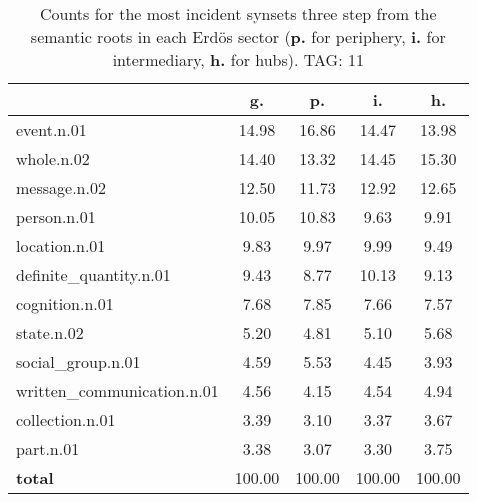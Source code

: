 \begin{table}[h!]
\begin{center}
\begin{tabular}{| l || c | c | c | c |}\hline
 & {\bf g.} & {\bf p.} & {\bf i.} & {\bf h.} \\\hline\hline
event.n.01 & 14.98  & 16.86  & 14.47  & 13.98 \\\hline
whole.n.02 & 14.40  & 13.32  & 14.45  & 15.30 \\\hline
message.n.02 & 12.50  & 11.73  & 12.92  & 12.65 \\\hline
person.n.01 & 10.05  & 10.83  & 9.63  & 9.91 \\\hline
location.n.01 & 9.83  & 9.97  & 9.99  & 9.49 \\\hline
definite\_quantity.n.01 & 9.43  & 8.77  & 10.13  & 9.13 \\\hline
cognition.n.01 & 7.68  & 7.85  & 7.66  & 7.57 \\\hline
state.n.02 & 5.20  & 4.81  & 5.10  & 5.68 \\\hline
social\_group.n.01 & 4.59  & 5.53  & 4.45  & 3.93 \\\hline
written\_communication.n.01 & 4.56  & 4.15  & 4.54  & 4.94 \\\hline
collection.n.01 & 3.39  & 3.10  & 3.37  & 3.67 \\\hline
part.n.01 & 3.38  & 3.07  & 3.30  & 3.75 \\\hline\hline
{{\bf total}} & 100.00  & 100.00  & 100.00  & 100.00 \\\hline
\end{tabular}
\caption{Counts for the most incident synsets three step from the semantic roots in each Erd\"os sector ({\bf p.} for periphery, {\bf i.} for intermediary, {\bf h.} for hubs). TAG: 11}
\end{center}
\end{table}